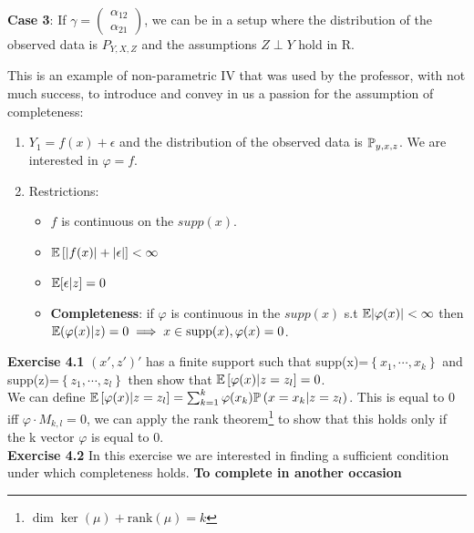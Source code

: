 \documentclass{article}
\begin{document}
\begin{example}
        \textbf{Case 3}: If \(\gamma = \begin{pmatrix} \alpha_{12} \\ \alpha_{21} \end{pmatrix}\), we can be in a setup where the distribution of the observed data is \(P_{Y, X, Z}\) and the assumptions \(Z \perp Y\) hold in R.
    \end{example}


    \begin{example}
        This is an example of non-parametric IV that was used by the professor, with not much success, to introduce and convey in us a passion for the assumption of completeness:

\begin{enumerate}
    \item \(Y_{1}=f(x)+\epsilon\) and the distribution of the observed data is \(\mathbb{P}_{y,x,z}\). We are interested in $\varphi=f$.
    \item Restrictions: \begin{itemize}
        \item \(f\) is continuous on the \(supp(x)\).
        \item \(\mathbb{E}\left[|f(x)|+|\epsilon|\right]<\infty\)
        \item \(\mathbb{E}[\epsilon|z]=0\)
        \item \textbf{Completeness}: if $\varphi$ is continuous in the \(supp(x)\) s.t \(\mathbb{E} |\varphi(x)|<\infty\) then \(\mathbb{E}(\varphi(x)|z)=0 \implies x\in \text{supp}(x), \varphi(x)=0 \). 
    \end{itemize}
\end{enumerate}
    \end{example}


    \begin{example}
        \textbf{Exercise 4.1} \((x', z')'\) has a finite support such that supp(x)=\(\left\{x_{1}, \cdots, x_{k}\right\}\) and supp(z)=\(\left\{z_{1}, \cdots, z_{l}\right\}\) then show that \(\mathbb{E}\left[\varphi(x)|z=z_{l}\right]=0\). \\
        We can define \(\mathbb{E}\left[\varphi(x)|z=z_{l}\right]=\sum_{k=1}^{k}\varphi(x_{k})\mathbb{P} \left(x=x_{k}|z=z_{l}\right)\). This is equal to 0 iff \(\varphi \cdot M_{k,l}=0\), we can apply the rank theorem\footnote{\(\dim \ker(\mu) + \text{rank}(\mu)=k\)} to show that this holds only if the k vector $\varphi$ is equal to 0. \\

    \textbf{Exercise 4.2}
In this exercise we are interested in finding a sufficient condition under which completeness holds. \textbf{To complete in another occasion}

    \end{example}
\end{document}
